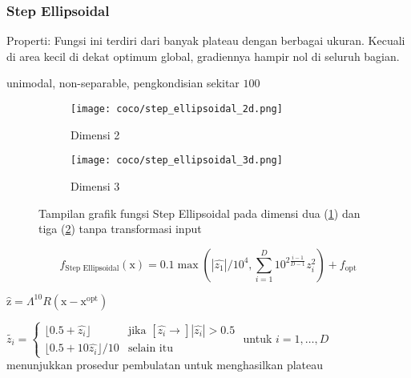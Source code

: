 \subsubsection{Step Ellipsoidal}
\noindent Properti:
Fungsi ini terdiri dari banyak plateau dengan berbagai ukuran. Kecuali di area kecil di dekat optimum global, gradiennya hampir nol di seluruh bagian.
\begin{packed_item}
  \item unimodal, non-separable, pengkondisian sekitar $100$
\end{packed_item}
\begin{figure}[H]
	\centering
	\begin{subfigure}[b]{0.4\textwidth}
		\centering
		\texttt{[image: coco/step\_ellipsoidal\_2d.png]}
		\caption{Dimensi 2}
		\label{fig:step_ellipsoidal_coco_2d}
	\end{subfigure}
	\hfill
	\begin{subfigure}[b]{0.4\textwidth}
		\centering
		\texttt{[image: coco/step\_ellipsoidal\_3d.png]}
		\caption{Dimensi 3}
		\label{fig:step_ellipsoidal_coco_3d}
	\end{subfigure}
	\caption{Tampilan grafik fungsi Step Ellipsoidal pada dimensi dua (\cref{fig:step_ellipsoidal_coco_2d}) dan tiga (\cref{fig:step_ellipsoidal_coco_3d}) tanpa transformasi input}
	\label{fig:step_ellipsoidal_coco}
\end{figure}
\begin{equation}
  f_{\text{Step Ellipsoidal}}(\mathrm{x})=0.1\max(|\hat{z_1}|/10^4,\sum_{i=1}^{D}10^{2\frac{i-1}{D-1}}z_i^2)+f_{\text{opt}}
\end{equation}
\begin{packed_item}
    \item $\hat{\mathrm{z}}=\Lambda^{10}R(\mathrm{x}-\mathrm{x}^{\text{opt}})$
    \item $\tilde{z_i}=\begin{cases}
      \lfloor 0.5+\hat{z_i}\rfloor & \text{jika }[\hat{z_i}\to]|\hat{z_i}| > 0.5\\
      \lfloor 0.5+10\hat{z_i}\rfloor/10 & \text{selain itu}
    \end{cases}$ untuk $i=1,\ldots,D$\\menunjukkan prosedur pembulatan untuk menghasilkan plateau
\end{packed_item}

